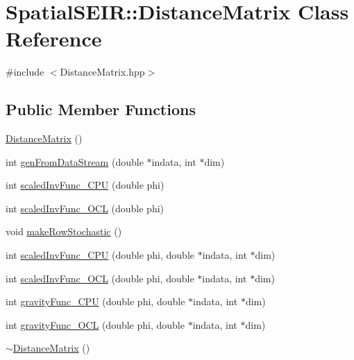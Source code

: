 \hypertarget{classSpatialSEIR_1_1DistanceMatrix}{\section{Spatial\-S\-E\-I\-R\-:\-:Distance\-Matrix Class Reference}
\label{classSpatialSEIR_1_1DistanceMatrix}
}


{\ttfamily \#include $<$Distance\-Matrix.\-hpp$>$}

\subsection*{Public Member Functions}
\begin{DoxyCompactItemize}
\item 
\hyperlink{classSpatialSEIR_1_1DistanceMatrix_aca08e8d8d4eb9343cfe76504e6919eb1}{Distance\-Matrix} ()
\item 
int \hyperlink{classSpatialSEIR_1_1DistanceMatrix_aded67777dcd95c9bf0fb3ddb56d7dfb4}{gen\-From\-Data\-Stream} (double $\ast$indata, int $\ast$dim)
\item 
int \hyperlink{classSpatialSEIR_1_1DistanceMatrix_ab35ab14a7e1aed23606233d1dbe1ceab}{scaled\-Inv\-Func\-\_\-\-C\-P\-U} (double phi)
\item 
int \hyperlink{classSpatialSEIR_1_1DistanceMatrix_ae1b36a58e2863f2e118a8ec62ef54e34}{scaled\-Inv\-Func\-\_\-\-O\-C\-L} (double phi)
\item 
void \hyperlink{classSpatialSEIR_1_1DistanceMatrix_a55c0d0a8fdae58e8f556cdeaefc773ed}{make\-Row\-Stochastic} ()
\item 
int \hyperlink{classSpatialSEIR_1_1DistanceMatrix_aff218ad03f6d91386dd9db4c7abdc22f}{scaled\-Inv\-Func\-\_\-\-C\-P\-U} (double phi, double $\ast$indata, int $\ast$dim)
\item 
int \hyperlink{classSpatialSEIR_1_1DistanceMatrix_a142a89fcc6609ff4e994889472bab675}{scaled\-Inv\-Func\-\_\-\-O\-C\-L} (double phi, double $\ast$indata, int $\ast$dim)
\item 
int \hyperlink{classSpatialSEIR_1_1DistanceMatrix_a5035e87c8f600767304739df5cc63cfa}{gravity\-Func\-\_\-\-C\-P\-U} (double phi, double $\ast$indata, int $\ast$dim)
\item 
int \hyperlink{classSpatialSEIR_1_1DistanceMatrix_aec266e110000a5095dba70bb4f9650dd}{gravity\-Func\-\_\-\-O\-C\-L} (double phi, double $\ast$indata, int $\ast$dim)
\item 
\hyperlink{classSpatialSEIR_1_1DistanceMatrix_ab41476e0b1ad79fc549c40d2e1dbf850}{$\sim$\-Distance\-Matrix} ()
\end{DoxyCompactItemize}
